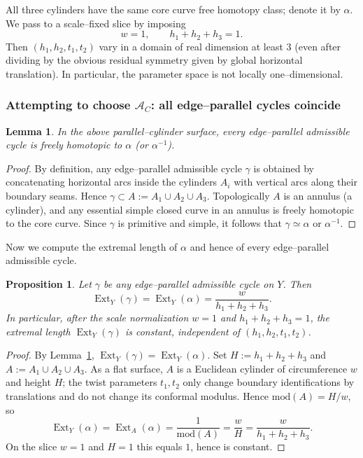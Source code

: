 \documentclass[a4paper,12pt]{amsart}
\DeclareMathOperator{\Ext}{Ext}
\theoremstyle{plain}
\newtheorem{proposition}[theorem]{Proposition}
\newtheorem{lemma}[theorem]{Lemma}
\theoremstyle{definition}
\begin{document}
All three cylinders have the same core curve free homotopy class; denote it by \(\alpha\).  We pass to a scale--fixed slice by imposing
\[
w=1,
\qquad
h_1+h_2+h_3=1.
\]
Then \((h_1,h_2,t_1,t_2)\) vary in a domain of real dimension at least \(3\) (even after dividing by the
obvious residual symmetry given by global horizontal translation).
In particular, the parameter space is not locally one--dimensional.

\subsubsection{Attempting to choose $\mathcal A_C$: all edge--parallel cycles coincide}

\begin{lemma}\label{lem:only_one_class}
In the above parallel--cylinder surface, every edge--parallel admissible cycle is freely homotopic
to \(\alpha\) (or \(\alpha^{-1}\)).
\end{lemma}

\begin{proof}
By definition, any edge--parallel admissible cycle \(\gamma\) is obtained by concatenating horizontal arcs
inside the cylinders \(A_i\) with vertical arcs along their boundary seams. Hence \(\gamma\subset A:=A_1\cup
A_2\cup A_3\). Topologically \(A\) is an annulus (a cylinder), and any essential simple closed curve in an
annulus is freely homotopic to the core curve. Since \(\gamma\) is primitive and simple, it follows that
\(\gamma\simeq \alpha\) or \(\alpha^{-1}\).
\end{proof}

Now we compute the extremal length of \(\alpha\) and hence of every edge--parallel admissible cycle.

\begin{proposition}\label{prop:rank_one_failure}
Let \(\gamma\) be any edge--parallel admissible cycle on \(Y\). Then
\[
\Ext_Y(\gamma)=\Ext_Y(\alpha)=\frac{w}{h_1+h_2+h_3}.
\]
In particular, after the scale normalization \(w=1\) and \(h_1+h_2+h_3=1\), the extremal length
\(\Ext_Y(\gamma)\) is constant, independent of \((h_1,h_2,t_1,t_2)\).
\end{proposition}

\begin{proof}
By Lemma~\ref{lem:only_one_class}, \(\Ext_Y(\gamma)=\Ext_Y(\alpha)\). Set \(H:=h_1+h_2+h_3\) and
\(A:=A_1\cup A_2\cup A_3\). As a flat surface, \(A\) is a Euclidean cylinder of circumference \(w\) and height
\(H\); the twist parameters \(t_1,t_2\) only change boundary identifications by translations and do not change
its conformal modulus. Hence \(\mathrm{mod}(A)=H/w\), so
\[
\Ext_Y(\alpha)=\Ext_A(\alpha)=\frac{1}{\mathrm{mod}(A)}=\frac{w}{H}=\frac{w}{h_1+h_2+h_3}.
\]
On the slice \(w=1\) and \(H=1\) this equals \(1\), hence is constant.
\end{proof}
\end{document}
